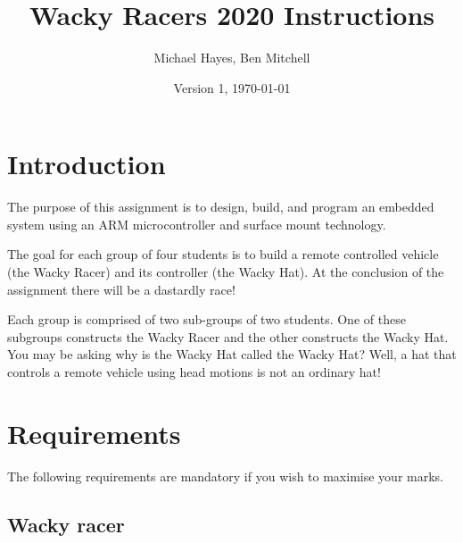 \documentclass[11pt, a4paper]{article}
\title{Wacky Racers 2020 Instructions}
\author{Michael Hayes, Ben Mitchell}
\date{Version 1, \today}
\begin{document}
\maketitle

\section{Introduction}

The purpose of this assignment is to design, build, and program an
embedded system using an ARM microcontroller and surface mount
technology.

The goal for each group of four students is to build a remote
controlled vehicle (the Wacky Racer) and its controller (the Wacky
Hat).  At the conclusion of the assignment there will be a dastardly race!

Each group is comprised of two sub-groups of two students.  One of
these subgroups constructs the Wacky Racer and the other constructs
the Wacky Hat.  You may be asking why is the Wacky Hat called the
Wacky Hat?  Well, a hat that controls a remote vehicle using head
motions is not an ordinary hat!


\section{Requirements}

The following requirements are mandatory if you wish to maximise your
marks.


\subsection{Wacky racer}
\end{document}
